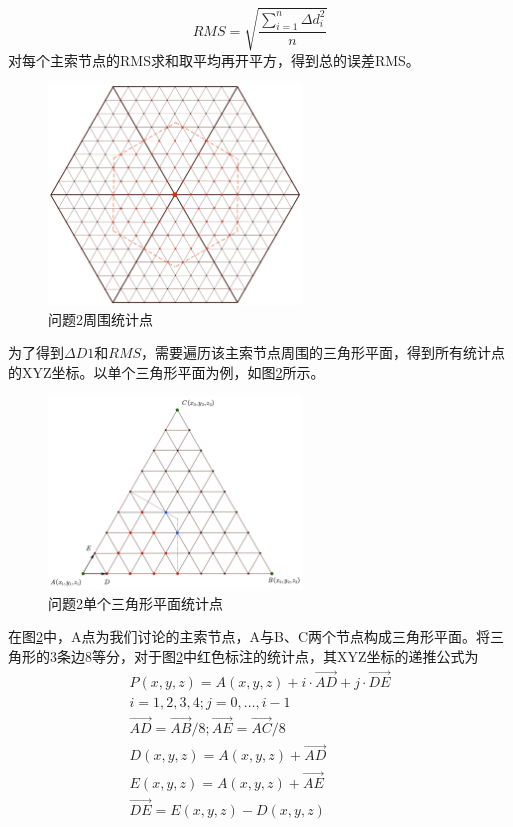 \documentclass[withoutpreface,bwprint]{cumcmthesis} %
\begin{document}
		\begin{equation}\label{}
		RMS=\sqrt{\frac{\sum_{i=1}^n{\Delta d_i^2}}{n}}
		\end{equation}
		对每个主索节点的RMS求和取平均再开平方，得到总的误差RMS。
			\begin{figure}[!htp]
			\centering
			\includegraphics[width=0.6\textwidth]{问题2周围统计点}
			\caption{问题2周围统计点}
			\label{问题2周围统计点}
		\end{figure}
		为了得到$\Delta D1$和$RMS$，需要遍历该主索节点周围的三角形平面，得到所有统计点的XYZ坐标。以单个三角形平面为例，如图\ref{问题2单个三角形平面统计点}所示。
		
			\begin{figure}[!htp]
			\centering
			\includegraphics[width=0.6\textwidth]{问题2单个三角形平面统计点}
			\caption{问题2单个三角形平面统计点}
			\label{问题2单个三角形平面统计点}
		\end{figure}
		在图\ref{问题2单个三角形平面统计点}中，A点为我们讨论的主索节点，A与B、C两个节点构成三角形平面。将三角形的3条边8等分，对于图\ref{问题2单个三角形平面统计点}中红色标注的统计点，其XYZ坐标的递推公式为
	\begin{equation}
	\begin{gathered}
	P(x, y, z)=A(x, y, z)+i \cdot \overrightarrow{A D}+j \cdot \overrightarrow{D E} \\
	i=1,2,3,4 ; j=0, \ldots, i-1 \\
	\overrightarrow{A D}=\overrightarrow{A B} / 8 ; \overrightarrow{A E}=\overrightarrow{A C} / 8 \\
	D(x, y, z)=A(x, y, z)+\overrightarrow{A D} \\
	E(x, y, z)=A(x, y, z)+\overrightarrow{A E} \\
	\overrightarrow{D E}=E(x, y, z)-D(x, y, z)
	\end{gathered}
	\end{equation}
	
\end{document}
